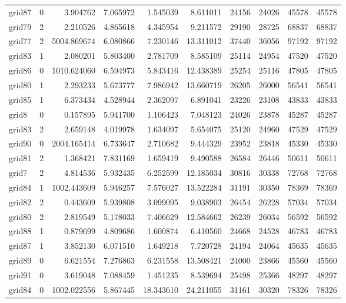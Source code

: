 \begin{longtable}{|l|r|r|r|r|r|r|r|r|r|}
grid87 & 0 & 3.904762 & 7.065972 & 1.545039 & 8.611011 & 24156 & 24026 & 45578 & 45578 \\
grid79 & 2 & 2.210526 & 4.865618 & 4.345954 & 9.211572 & 29190 & 28725 & 68837 & 68837 \\
grid77 & 2 & 5004.869674 & 6.080866 & 7.230146 & 13.311012 & 37440 & 36056 & 97192 & 97192 \\
grid83 & 1 & 2.080201 & 5.803400 & 2.781709 & 8.585109 & 25114 & 24954 & 47520 & 47520 \\
grid86 & 0 & 1010.624060 & 6.594973 & 5.843416 & 12.438389 & 25254 & 25116 & 47805 & 47805 \\
grid80 & 1 & 2.293233 & 5.673777 & 7.986942 & 13.660719 & 26205 & 26000 & 56541 & 56541 \\
grid85 & 1 & 6.373434 & 4.528944 & 2.362097 & 6.891041 & 23226 & 23108 & 43833 & 43833 \\
grid8 & 0 & 0.157895 & 5.941700 & 1.106423 & 7.048123 & 24026 & 23878 & 45287 & 45287 \\
grid83 & 2 & 2.659148 & 4.019978 & 1.634097 & 5.654075 & 25120 & 24960 & 47529 & 47529 \\
grid90 & 0 & 2004.165414 & 6.733647 & 2.710682 & 9.444329 & 23952 & 23818 & 45330 & 45330 \\
grid81 & 2 & 1.368421 & 7.831169 & 1.659419 & 9.490588 & 26584 & 26446 & 50611 & 50611 \\
grid7 & 2 & 4.814536 & 5.932435 & 6.252599 & 12.185034 & 30816 & 30338 & 72768 & 72768 \\
grid84 & 1 & 1002.443609 & 5.946257 & 7.576027 & 13.522284 & 31191 & 30350 & 78369 & 78369 \\
grid82 & 2 & 0.443609 & 5.939808 & 3.099095 & 9.038903 & 26454 & 26228 & 57034 & 57034 \\
grid80 & 2 & 2.819549 & 5.178033 & 7.406629 & 12.584662 & 26239 & 26034 & 56592 & 56592 \\
grid88 & 1 & 0.879699 & 4.809686 & 1.600874 & 6.410560 & 24668 & 24528 & 46783 & 46783 \\
grid87 & 1 & 3.852130 & 6.071510 & 1.649218 & 7.720728 & 24194 & 24064 & 45635 & 45635 \\
grid89 & 0 & 6.621554 & 7.276863 & 6.231558 & 13.508421 & 24000 & 23866 & 45560 & 45560 \\
grid91 & 0 & 3.619048 & 7.088459 & 1.451235 & 8.539694 & 25498 & 25366 & 48297 & 48297 \\
grid84 & 0 & 1002.022556 & 5.867445 & 18.343610 & 24.211055 & 31161 & 30320 & 78326 & 78326 \\

\end{longtable}
